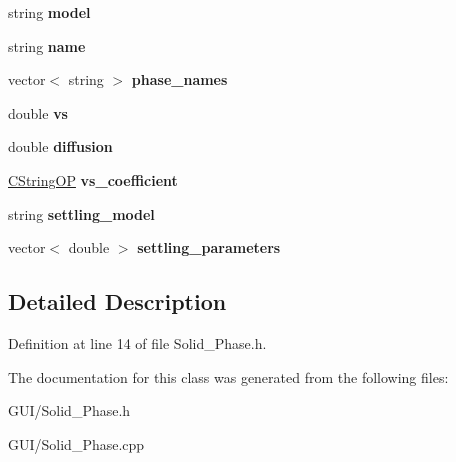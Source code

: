 \begin{DoxyCompactItemize}
string {\bfseries model}
\item 
\mbox{\label{class_c_solid___phase_a21b5e4a3a5a60b3a0024b5b09ee50267}} 
string {\bfseries name}
\item 
\mbox{\label{class_c_solid___phase_a2af2548990917818d4da15f1a25d4b00}} 
vector$<$ string $>$ {\bfseries phase\+\_\+names}
\item 
\mbox{\label{class_c_solid___phase_aed9c96654da35ded34fcecbc0b990613}} 
double {\bfseries vs}
\item 
\mbox{\label{class_c_solid___phase_a7c0034f2571cf23f5004edcad843b948}} 
double {\bfseries diffusion}
\item 
\mbox{\label{class_c_solid___phase_a7855cfec56830005c908cfc449691d30}} 
\hyperlink{class_c_string_o_p}{C\+String\+OP} {\bfseries vs\+\_\+coefficient}
\item 
\mbox{\label{class_c_solid___phase_a89b197286b08b18f80cd9c66f623263e}} 
string {\bfseries settling\+\_\+model}
\item 
\mbox{\label{class_c_solid___phase_ada892865fe2a2e3d3598dfa0490b3092}} 
vector$<$ double $>$ {\bfseries settling\+\_\+parameters}
\end{DoxyCompactItemize}


\subsection{Detailed Description}


Definition at line 14 of file Solid\+\_\+\+Phase.\+h.



The documentation for this class was generated from the following files\+:\begin{DoxyCompactItemize}
\item 
G\+U\+I/Solid\+\_\+\+Phase.\+h\item 
G\+U\+I/Solid\+\_\+\+Phase.\+cpp\end{DoxyCompactItemize}
